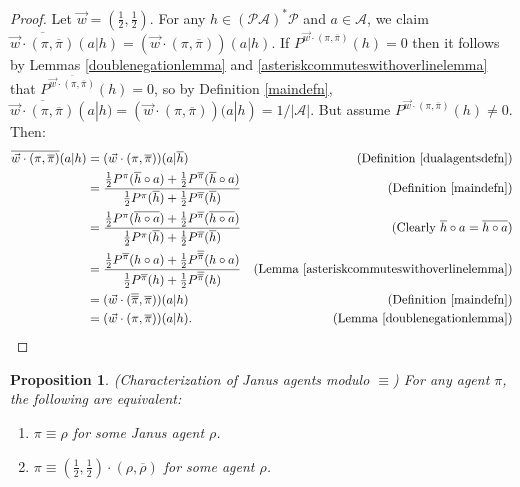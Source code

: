 \documentclass[twoside]{article}
\newtheorem{proposition}[theorem]{Proposition}
\begin{document}
\begin{proof}
    Let $\vec w=(\frac12,\frac12)$.
    For any $h\in(\mathcal P\mathcal A)^*\mathcal P$ and $a\in\mathcal A$,
    we claim
    $\overline{\vec w\cdot(\pi,\overline{\pi})}(a|h)
    =(\vec w\cdot(\pi,\overline{\pi}))(a|h)$.
    If $P^{\vec w\cdot(\pi,\overline\pi)}(h)=0$
    then it follows by Lemmas \ref{doublenegationlemma} and
    \ref{asteriskcommuteswithoverlinelemma} that
    $P^{\overline{\vec w\cdot(\pi,\overline\pi)}}(h)=0$,
    so by Definition \ref{maindefn},
    $\overline{\vec w\cdot(\pi,\overline{\pi})}(a|h)
    =(\vec w\cdot(\pi,\overline{\pi}))(a|h)=1/|\mathcal A|$.
    But assume $P^{\vec w\cdot(\pi,\overline\pi)}(h)\not=0$.
    Then:
    \begin{align*}
        \overline{\vec w\cdot(\pi,\overline{\pi})}(a|h)
        &= (\vec w\cdot(\pi,\overline{\pi}))(a|\overline h)
            &\mbox{(Definition \ref{dualagentsdefn})}\\
        &= \frac
            {\frac12P^\pi(\overline h\circ a)+\frac12P^{\overline\pi}(\overline h\circ a)}
            {\frac12P^\pi(\overline h)+\frac12P^{\overline\pi}(\overline h)}
            &\mbox{(Definition \ref{maindefn})}\\
        &= \frac
            {\frac12P^\pi(\overline{h\circ a})+\frac12P^{\overline\pi}(\overline{h\circ a})}
            {\frac12P^\pi(\overline h)+\frac12P^{\overline\pi}(\overline h)}
            &\mbox{(Clearly $\overline h\circ a=\overline{h\circ a}$)}\\
        &= \frac
            {\frac12P^{\overline\pi}(h\circ a)+\frac12P^{\overline{\overline\pi}}(h\circ a)}
            {\frac12P^{\overline\pi}(h)+\frac12P^{\overline{\overline\pi}}(h)}
            &\mbox{(Lemma \ref{asteriskcommuteswithoverlinelemma})}\\
        &= (\vec w\cdot(\overline{\overline\pi},\overline\pi))(a|h)
            &\mbox{(Definition \ref{maindefn})}\\
        &= (\vec w\cdot(\pi,\overline\pi))(a|h).
            &\mbox{(Lemma \ref{doublenegationlemma})}
    \end{align*}
\end{proof}

\begin{proposition}
    (Characterization of Janus agents modulo $\equiv$)
    For any agent $\pi$, the following are equivalent:
    \begin{enumerate}
        \item $\pi\equiv\rho$ for some Janus agent $\rho$.
        \item $\pi\equiv(\frac12,\frac12)\cdot(\rho,\overline{\rho})$
            for some agent $\rho$.
    \end{enumerate}
\end{proposition}
\end{document}
